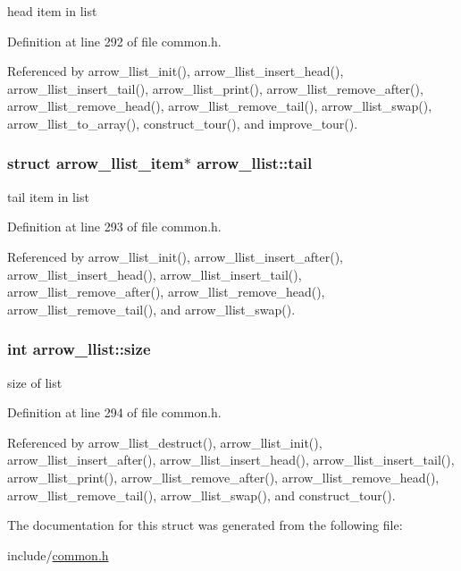 head item in list 

Definition at line 292 of file common.h.

Referenced by arrow\_\-llist\_\-init(), arrow\_\-llist\_\-insert\_\-head(), arrow\_\-llist\_\-insert\_\-tail(), arrow\_\-llist\_\-print(), arrow\_\-llist\_\-remove\_\-after(), arrow\_\-llist\_\-remove\_\-head(), arrow\_\-llist\_\-remove\_\-tail(), arrow\_\-llist\_\-swap(), arrow\_\-llist\_\-to\_\-array(), construct\_\-tour(), and improve\_\-tour().\hypertarget{structarrow__llist_17aad561a27cd835fef598e8ffd135c8}{
\subsubsection{\setlength{\rightskip}{0pt plus 5cm}struct {\bf arrow\_\-llist\_\-item}$\ast$ {\bf arrow\_\-llist::tail}}}
\label{structarrow__llist_17aad561a27cd835fef598e8ffd135c8}


tail item in list 

Definition at line 293 of file common.h.

Referenced by arrow\_\-llist\_\-init(), arrow\_\-llist\_\-insert\_\-after(), arrow\_\-llist\_\-insert\_\-head(), arrow\_\-llist\_\-insert\_\-tail(), arrow\_\-llist\_\-remove\_\-after(), arrow\_\-llist\_\-remove\_\-head(), arrow\_\-llist\_\-remove\_\-tail(), and arrow\_\-llist\_\-swap().\hypertarget{structarrow__llist_89bdc72883d1d24717445c8087b6b0dc}{
\subsubsection{\setlength{\rightskip}{0pt plus 5cm}int {\bf arrow\_\-llist::size}}}
\label{structarrow__llist_89bdc72883d1d24717445c8087b6b0dc}


size of list 

Definition at line 294 of file common.h.

Referenced by arrow\_\-llist\_\-destruct(), arrow\_\-llist\_\-init(), arrow\_\-llist\_\-insert\_\-after(), arrow\_\-llist\_\-insert\_\-head(), arrow\_\-llist\_\-insert\_\-tail(), arrow\_\-llist\_\-print(), arrow\_\-llist\_\-remove\_\-after(), arrow\_\-llist\_\-remove\_\-head(), arrow\_\-llist\_\-remove\_\-tail(), arrow\_\-llist\_\-swap(), and construct\_\-tour().

The documentation for this struct was generated from the following file:\begin{CompactItemize}
\item 
include/\hyperlink{common_8h}{common.h}\end{CompactItemize}
